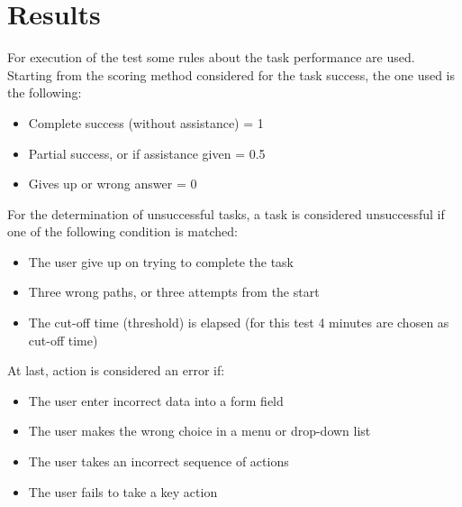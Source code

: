 %
%
\chapter{Results}
For execution of the test some rules about the task performance are used.
Starting from the scoring method considered for the task success, the one used is the following:
\begin{itemize}
\item Complete success (without assistance) = 1
\item Partial success, or if assistance given = 0.5
\item Gives up or wrong answer = 0
\end{itemize}
For the determination of unsuccessful tasks, a task is considered unsuccessful if one of the following condition is matched:
\begin{itemize}
\item The user give up on trying to complete the task
\item Three wrong paths, or three attempts from the start
\item The cut-off time (threshold) is elapsed (for this test 4 minutes are chosen as cut-off time)
\end{itemize}
At last, action is considered an error if:
\begin{itemize}
\item The user enter incorrect data into a form field
\item The user makes the wrong choice in a menu or drop-down list
\item The user takes an incorrect sequence of actions
\item The user fails to take a key action
\end{itemize}

%
%
